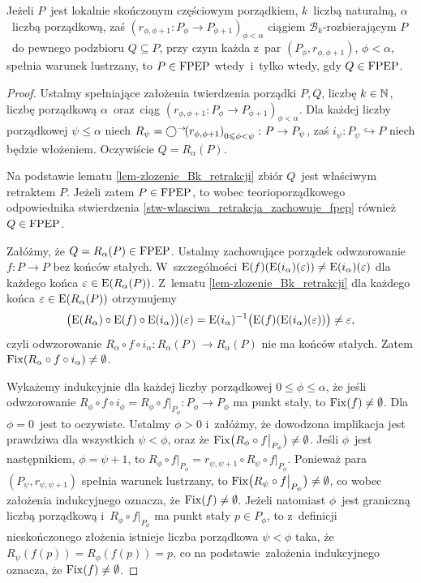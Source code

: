 \begin{tw}\label{tw-schroder-like-o-ciagu-retrakcji-lustrzanych}
Jeżeli $P$~jest lokalnie skończonym częściowym porządkiem, $k$~liczbą naturalną, $\alpha$~liczbą porządkową, zaś $\left(r_{\phi,\phi+1}\colon P_\phi\to P_{\phi+1}\right)_{\phi<\alpha}$ ciągiem \mbox{$\mathcal{B}_k$-rozbierającym} $P$~do pewnego podzbioru $Q\subseteq P$, przy czym każda z~par $\left(P_\phi,r_{\phi,\phi+1}\right)$, $\phi<\alpha$, spełnia warunek lustrzany, to $P\in\mathrm{FPEP}$ wtedy~i~tylko wtedy, gdy $Q\in\mathrm{FPEP}$.
\end{tw}
\begin{proof}
Ustalmy spełniające założenia twierdzenia porządki $P,Q$, liczbę $k\in\mathbb{N}$, liczbę porządkową $\alpha$~oraz~ciąg $\left(r_{\phi,\phi+1}\colon P_\phi\to P_{\phi+1}\right)_{\phi<\alpha}$. Dla każdej liczby porządkowej $\psi\leq \alpha$ niech $R_\psi=\bigcirc^\rightarrow\!\!\left(r_{\phi,\phi+1}\right)_{0\leqslant \phi<\psi} \colon P\to P_\psi$, zaś $i_\psi\colon P_\psi\hookrightarrow P$ niech będzie włożeniem. Oczywiście $Q=R_\alpha(P)$.

Na podstawie lematu \ref{lem-zlozenie_Bk_retrakcji} zbiór $Q$~jest właściwym retraktem $P$. Jeżeli zatem $P\in\mathrm{FPEP}$, to wobec teorioporządkowego odpowiednika stwierdzenia \ref{stw-wlasciwa_retrakcja_zachowuje_fpep} również $Q\in\mathrm{FPEP}$.

Załóżmy, że $Q=R_\alpha(P)\in \mathrm{FPEP}$. Ustalmy zachowujące porządek odwzorowanie $f\colon P\to P$ bez końców stałych. W~szczególności $\mathrm{E}(f)(\mathrm{E}(i_\alpha)(\varepsilon))\not=\mathrm{E}(i_\alpha)(\varepsilon)$ dla każdego końca $\varepsilon\in\mathrm{E}(R_\alpha(P))$. Z~lematu \ref{lem-zlozenie_Bk_retrakcji} dla każdego końca $\varepsilon\in\mathrm{E}(R_\alpha(P))$ otrzymujemy \[\bigl(\mathrm{E}(R_\alpha)\circ \mathrm{E}(f)\circ \mathrm{E}(i_\alpha)\bigr)(\varepsilon)=\mathrm{E}(i_\alpha)^{-1}\bigl(\mathrm{E}(f)(\mathrm{E}(i_\alpha)(\varepsilon))\bigr)\not=\varepsilon,\] czyli odwzorowanie $R_\alpha\circ f\circ i_\alpha\colon R_\alpha(P)\to R_\alpha(P)$ nie ma końców stałych. Zatem $\operatorname{Fix}(R_\alpha\circ f\circ i_\alpha)\not=\emptyset$.

Wykażemy indukcyjnie dla każdej liczby porządkowej $0\leq \phi\leq \alpha$, że jeśli odwzorowanie $R_\phi\circ f\circ i_\phi=R_\phi\circ f\big|_{P_\phi}\colon P_\phi\to P_\phi$ ma punkt stały, to $\operatorname{Fix}(f)\not=\emptyset$. Dla $\phi=0$~jest to oczywiste. Ustalmy $\phi>0$ i~załóżmy, że dowodzona implikacja jest prawdziwa dla wszystkich $\psi<\phi$, oraz że $\operatorname{Fix}\bigl(R_\phi\circ f\big|_{P_\phi}\bigr)\not=\emptyset$. Jeśli $\phi$~jest następnikiem, $\phi=\psi+1$, to $R_\phi\circ f\big|_{P_\phi}=r_{\psi,\psi+1}\circ R_\psi\circ f\big|_{P_\phi}$. Ponieważ para $\left(P_\psi,r_{\psi,\psi+1}\right)$ spełnia warunek lustrzany, to $\operatorname{Fix}\bigl(R_\psi\circ f\big|_{P_\psi}\bigr)\not=\emptyset$, co wobec założenia indukcyjnego oznacza, że $\operatorname{Fix}(f)\not=\emptyset$. Jeżeli natomiast $\phi$~jest graniczną liczbą porządkową i~$R_\phi\circ f\big|_{P_\phi}$ ma punkt stały $p\in P_\phi$, to z~definicji nieskończonego złożenia istnieje liczba porządkowa $\psi<\phi$ taka, że $R_\psi(f(p))=R_\phi(f(p))=p$, co na podstawie~założenia indukcyjnego oznacza, że $\operatorname{Fix}(f)\not=\emptyset$.


\end{proof}
